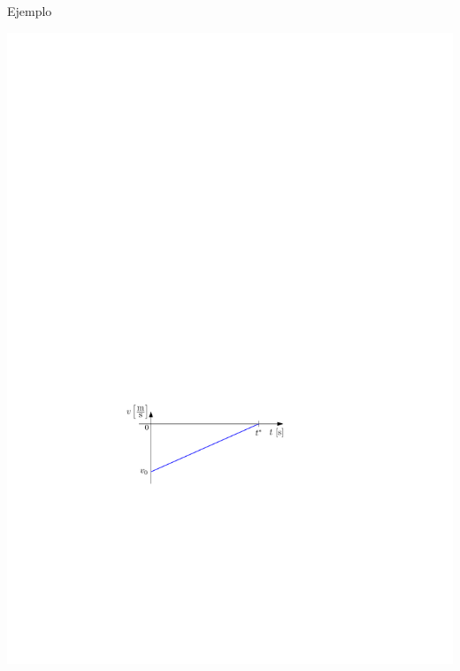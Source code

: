 \begin{example}{Ejemplo}
\begin{center}
    \includegraphics[]{img/plot2b.pdf}
    

\end{center}
\end{example}
